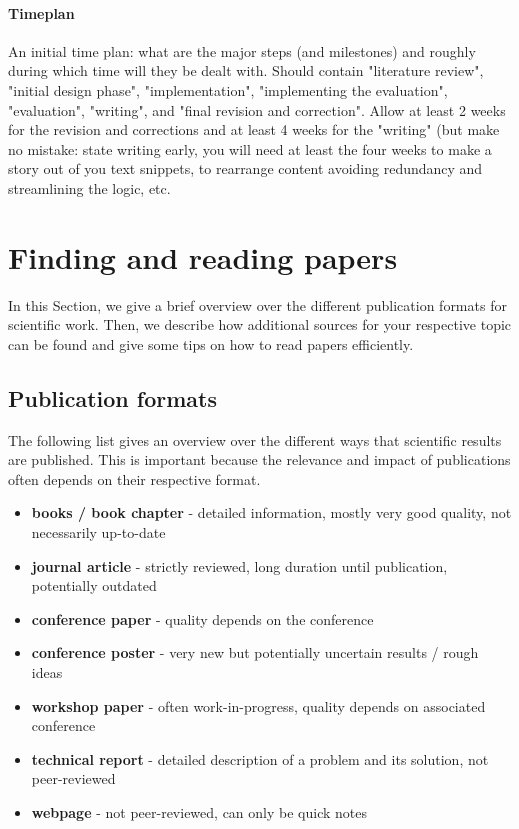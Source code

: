 \documentclass{article}
\begin{document}
\paragraph{Timeplan}
An initial time plan: what are the major steps (and milestones) and roughly during which time will they be dealt with. Should contain "literature review", "initial design phase", "implementation", "implementing the evaluation", "evaluation", "writing", and "final revision and correction". Allow at least 2 weeks for the revision and corrections and at least 4 weeks for the "writing" (but make no mistake: state writing early, you will need at least the four weeks to make a story out of you text snippets, to rearrange content avoiding redundancy and streamlining the logic, etc.










\section{Finding and reading papers}

In this Section, we give a brief overview over the different publication formats for scientific work.
Then, we describe how additional sources for your respective topic can be found and give some tips on how to read papers efficiently.


\subsection{Publication formats}

The following list gives an overview over the different ways that scientific results are published.
This is important because the relevance and impact of publications often depends on their respective format.

\begin{itemize}
	\item \textbf{books / book chapter} - detailed information, mostly very good quality, not necessarily up-to-date
	\item \textbf{journal article} - strictly reviewed, long duration until publication, potentially outdated
	\item \textbf{conference paper} - quality depends on the conference
	\item \textbf{conference poster} - very new but potentially uncertain results / rough ideas
	\item \textbf{workshop paper} - often work-in-progress, quality depends on associated conference
	\item \textbf{technical report} - detailed description of a problem and its solution, not peer-reviewed
	\item \textbf{webpage} - not peer-reviewed, can only be quick notes
\end{itemize}
\end{document}
